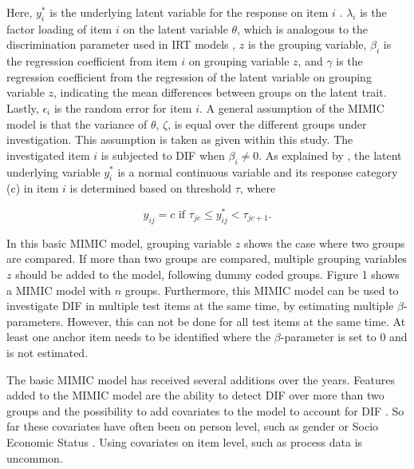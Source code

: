 \documentclass{interact}
\begin{document}
Here, $y_i^*$ is the underlying latent variable for the response on item $i$ \parencite{wirth2007item}. $\lambda_i$ is the factor loading of item $i$ on the latent variable $\theta$, which is analogous to the discrimination parameter used in IRT models \parencite{bulut2017detecting}, $z$ is the grouping variable, $\beta_i$ is the regression coefficient from item $i$ on grouping variable $z$, and $\gamma$ is the regression coefficient from the regression of the latent variable on grouping variable $z$, indicating the mean differences between groups on the latent trait. Lastly, $\epsilon_i$ is the random error for item $i$. A general assumption of the MIMIC model is that the variance of $\theta$, $\zeta$, is equal over the different groups under investigation. This assumption is taken as given within this study. The investigated item $i$ is subjected to DIF when $\beta_i \neq 0$. As explained by \textcite{wirth2007item}, the latent underlying variable $y_i^*$ is a normal continuous variable and its response category (c) in item $i$ is determined based on threshold $\tau$, where 

\begin{equation}
    y_{ij} = c \mbox{  if  } \tau_{jc} \le y^*_{ij} < \tau_{jc+1}.
\end{equation}
\hspace{.5cm}

In this basic MIMIC model, grouping variable $z$ shows the case where two groups are compared. If more than two groups are compared, multiple grouping variables $z$ should be added to the model, following dummy coded groups. Figure 1 shows a MIMIC model with $n$ groups. Furthermore, this MIMIC model can be used to investigate DIF in multiple test items at the same time, by estimating multiple $\beta$-parameters. However, this can not be done for all test items at the same time. At least one anchor item needs to be identified where the $\beta$-parameter is set to 0 and is not estimated.  

The basic MIMIC model has received several additions over the years. Features added to the MIMIC model are the ability to detect DIF over more than two groups \parencite{dell2021investigating} and the possibility to add covariates to the model to account for DIF \parencite{chun2014using, woods2009evaluation}. So far these covariates have often been on person level, such as gender or Socio Economic Status \parencite{chun2014using}. Using covariates on item level, such as process data is uncommon. 
\end{document}
